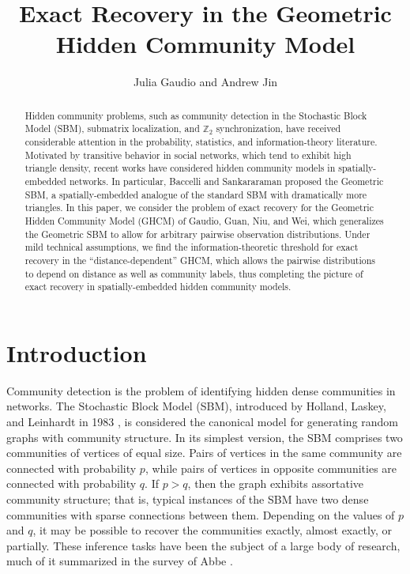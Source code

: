 \documentclass{article}
\title{Exact Recovery in the Geometric Hidden Community Model}
\author{Julia Gaudio and Andrew Jin}
\newcommand{\Z}{\mathbb{Z}}
\newcommand{\1}{\mathbbm{1}}
\theoremstyle{definition}
\theoremstyle{plain}
\begin{document}
\maketitle

\begin{abstract}
Hidden community problems, such as community detection in the Stochastic Block Model (SBM), submatrix localization, and $\Z_2$ synchronization, have received considerable attention in the probability, statistics, and information-theory literature. Motivated by transitive behavior in social networks, which tend to exhibit high triangle density, recent works have considered hidden community models in spatially-embedded networks. In particular, Baccelli and Sankararaman proposed the Geometric SBM, a spatially-embedded analogue of the standard SBM with dramatically more triangles. In this paper, we consider the problem of exact recovery for the Geometric Hidden Community Model (GHCM) of Gaudio, Guan, Niu, and Wei, which generalizes the Geometric SBM to allow for arbitrary pairwise observation distributions. Under mild technical assumptions, we find the information-theoretic threshold for exact recovery in the ``distance-dependent'' GHCM, which allows the pairwise distributions to depend on distance as well as community labels, thus completing the picture of exact recovery in spatially-embedded hidden community models. 
\end{abstract}

\section{Introduction}
\label{sec:introduction}
Community detection is the problem of identifying hidden dense communities in networks. The Stochastic Block Model (SBM), introduced by Holland, Laskey, and Leinhardt in 1983 \cite{Holland1983}, is considered the canonical model for generating random graphs with community structure. In its simplest version, the SBM comprises two communities of vertices of equal size. Pairs of vertices in the same community are connected with probability $p$, while pairs of vertices in opposite communities are connected with probability $q$. If $p > q$, then the graph exhibits assortative community structure; that is, typical instances of the SBM have two dense communities with sparse connections between them. Depending on the values of $p$ and $q$, it may be possible to recover the communities exactly, almost exactly, or partially. These inference tasks have been the subject of a large body of research, much of it summarized in the survey of Abbe \cite{Abbe2018}. 
\end{document}
